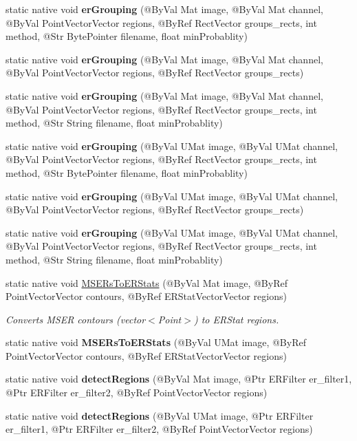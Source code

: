 \begin{DoxyCompactItemize}
\item 
static native void {\bfseries er\+Grouping} (@By\+Val Mat image, @By\+Val Mat channel, @By\+Val Point\+Vector\+Vector regions, @By\+Ref Rect\+Vector groups\+\_\+rects, int method, @Str Byte\+Pointer filename, float min\+Probablity)
\item 
static native void {\bfseries er\+Grouping} (@By\+Val Mat image, @By\+Val Mat channel, @By\+Val Point\+Vector\+Vector regions, @By\+Ref Rect\+Vector groups\+\_\+rects)
\item 
static native void {\bfseries er\+Grouping} (@By\+Val Mat image, @By\+Val Mat channel, @By\+Val Point\+Vector\+Vector regions, @By\+Ref Rect\+Vector groups\+\_\+rects, int method, @Str String filename, float min\+Probablity)
\item 
static native void {\bfseries er\+Grouping} (@By\+Val U\+Mat image, @By\+Val U\+Mat channel, @By\+Val Point\+Vector\+Vector regions, @By\+Ref Rect\+Vector groups\+\_\+rects, int method, @Str Byte\+Pointer filename, float min\+Probablity)
\item 
static native void {\bfseries er\+Grouping} (@By\+Val U\+Mat image, @By\+Val U\+Mat channel, @By\+Val Point\+Vector\+Vector regions, @By\+Ref Rect\+Vector groups\+\_\+rects)
\item 
static native void {\bfseries er\+Grouping} (@By\+Val U\+Mat image, @By\+Val U\+Mat channel, @By\+Val Point\+Vector\+Vector regions, @By\+Ref Rect\+Vector groups\+\_\+rects, int method, @Str String filename, float min\+Probablity)
\item 
static native void \hyperlink{group__text__detect_gad4c72b60ca712eeab78c52b946f649a2}{M\+S\+E\+Rs\+To\+E\+R\+Stats} (@By\+Val Mat image, @By\+Ref Point\+Vector\+Vector contours, @By\+Ref E\+R\+Stat\+Vector\+Vector regions)
\begin{DoxyCompactList}\small\item\em Converts M\+S\+ER contours (vector$<$Point$>$) to E\+R\+Stat regions. \end{DoxyCompactList}\item 
static native void {\bfseries M\+S\+E\+Rs\+To\+E\+R\+Stats} (@By\+Val U\+Mat image, @By\+Ref Point\+Vector\+Vector contours, @By\+Ref E\+R\+Stat\+Vector\+Vector regions)
\item 
static native void {\bfseries detect\+Regions} (@By\+Val Mat image, @Ptr E\+R\+Filter er\+\_\+filter1, @Ptr E\+R\+Filter er\+\_\+filter2, @By\+Ref Point\+Vector\+Vector regions)
\item 
static native void {\bfseries detect\+Regions} (@By\+Val U\+Mat image, @Ptr E\+R\+Filter er\+\_\+filter1, @Ptr E\+R\+Filter er\+\_\+filter2, @By\+Ref Point\+Vector\+Vector regions)

\end{DoxyCompactItemize}
